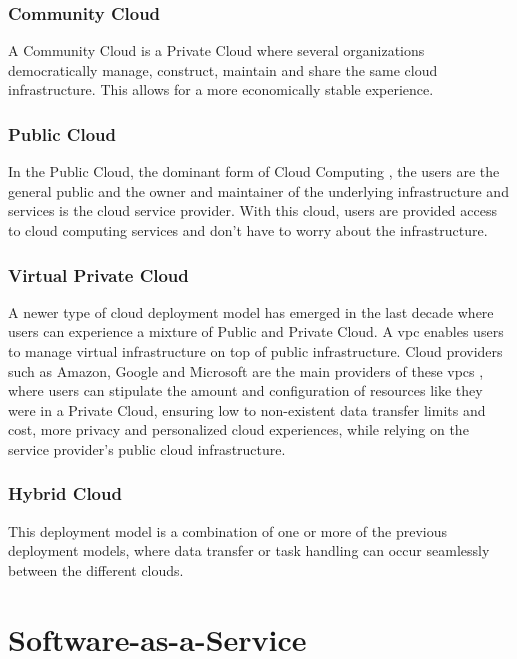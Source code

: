 \subsubsection{Community Cloud}\label{state-of-the-art:sss:community-cloud}
A Community Cloud is a Private Cloud where several organizations democratically manage, construct, maintain and share the same cloud infrastructure. This allows for a more economically stable experience.

\subsubsection{Public Cloud}\label{state-of-the-art:sss:public-cloud}
In the Public Cloud, the dominant form of Cloud Computing \Parencite{dillon_tharam_and_wu_chen_and_chang_elizabeth}, the users are the general public and the owner and maintainer of the underlying infrastructure and services is the cloud service provider. With this cloud, users are provided access to cloud computing services and don't have to worry about the infrastructure.

\subsubsection{Virtual Private Cloud}\label{state-of-the-art:sss:virtual-private-cloud}
A newer type of cloud deployment model has emerged in the last decade where users can experience a mixture of Public and Private Cloud. A \gls{vpc} enables users to manage virtual infrastructure on top of public infrastructure. Cloud providers such as Amazon, Google and Microsoft are the main providers of these \gls{vpc}s \Parencite{aljamal_el-mousa_jubair_2018}, where users can stipulate the amount and configuration of resources like they were in a Private Cloud, ensuring low to non-existent data transfer limits and cost, more privacy and personalized cloud experiences, while relying on the service provider's public cloud infrastructure.

\subsubsection{Hybrid Cloud}\label{state-of-the-art:sss:hybrid-cloud} 
This deployment model is a combination of one or more of the previous deployment models, where data transfer or task handling can occur seamlessly between the different clouds.

\section{Software-as-a-Service}\label{state-of-the-art:s:software-as-a-service}

